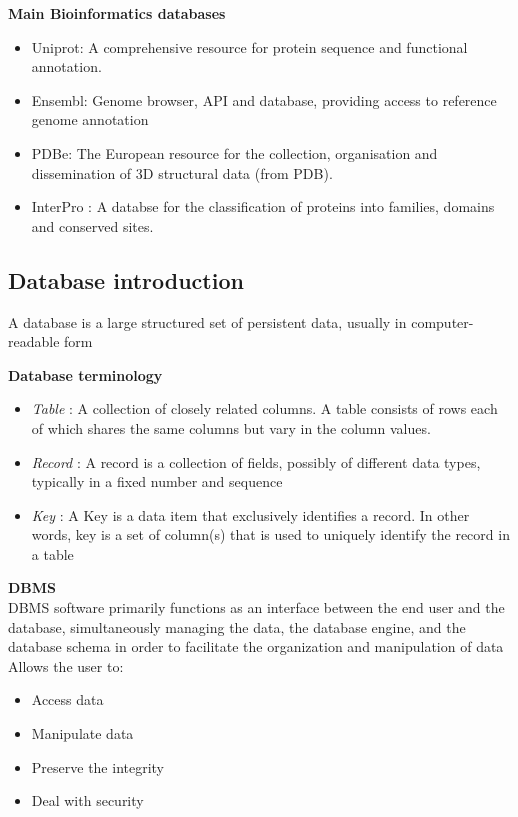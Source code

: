 \documentclass[11pt]{article}
\begin{document}
\textbf{Main Bioinformatics databases}\\
\begin{itemize}
\item Uniprot: A comprehensive resource for protein sequence and functional annotation.
\item Ensembl: Genome browser, API and database, providing access to reference genome annotation
\item PDBe: The European resource for the collection, organisation and dissemination
of 3D structural data (from PDB).
\item InterPro : A databse for the classification of proteins into families, domains
and conserved sites.
\end{itemize}

\subsection{Database introduction}
\label{sec:org202a1a5}
A database is a large structured set of persistent data, usually in
computer-readable form

\textbf{Database terminology}
\begin{itemize}
\item \emph{Table} : A collection of closely related columns. A table consists of rows each of which shares the same columns but vary in the column values.
\item \emph{Record} : A record is a collection of fields, possibly of different data
types, typically in a fixed number and sequence
\item \emph{Key} : A Key is a data item that exclusively identifies a record. In other
words, key is a set of column(s) that is used to uniquely identify the record
in a table
\end{itemize}

\textbf{DBMS}\\
DBMS software primarily functions as an interface between the end user and the
database, simultaneously managing the data, the database engine, and the
database schema in order to facilitate the organization and manipulation of data
Allows the user to:
\begin{itemize}
\item Access data
\item Manipulate data
\item Preserve the integrity
\item Deal with security
\end{itemize}
\end{document}
